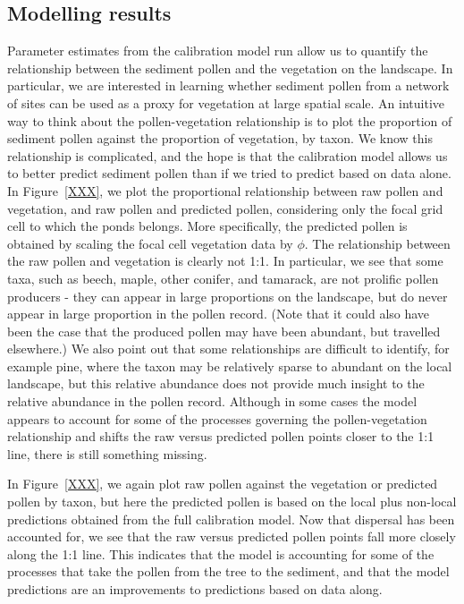 \documentclass[12pt]{article}
\begin{document}
\subsection{Modelling results}

Parameter estimates from the calibration model run allow us to
quantify the relationship between the sediment pollen and the
vegetation on the landscape. In particular, we are interested in
learning whether sediment pollen from a network of sites can be used
as a proxy for vegetation at large spatial scale. An intuitive way to
think about the pollen-vegetation relationship is to plot the
proportion of sediment pollen against the proportion of vegetation, by
taxon. We know this relationship is complicated, and the hope is that
the calibration model allows us to better predict sediment pollen than
if we tried to predict based on data alone. In Figure~\ref{XXX}, we
plot the proportional relationship between raw pollen and vegetation,
and raw pollen and predicted pollen, considering only the focal grid
cell to which the ponds belongs. More specifically, the predicted
pollen is obtained by scaling the focal cell vegetation data by
$\phi$. The relationship between the raw pollen and vegetation is
clearly not 1:1. In particular, we see that some taxa, such as beech,
maple, other conifer, and tamarack, are not prolific pollen producers
- they can appear in large proportions on the landscape, but do never
appear in large proportion in the pollen record. (Note that it could
also have been the case that the produced pollen may have been
abundant, but travelled elsewhere.) We also point out that some
relationships are difficult to identify, for example pine, where the
taxon may be relatively sparse to abundant on the local landscape, but
this relative abundance does not provide much insight to the relative
abundance in the pollen record. Although in some cases the model
appears to account for some of the processes governing the
pollen-vegetation relationship and shifts the raw versus predicted
pollen points closer to the 1:1 line, there is still something
missing.

In Figure~\ref{XXX}, we again plot raw pollen against the vegetation
or predicted pollen by taxon, but here the predicted pollen is based
on the local plus non-local predictions obtained from the full
calibration model. Now that dispersal has been accounted for, we see
that the raw versus predicted pollen points fall more closely along
the 1:1 line. This indicates that the model is accounting for some of
the processes that take the pollen from the tree to the sediment, and
that the model predictions are an improvements to predictions based on
data along.
\end{document}

